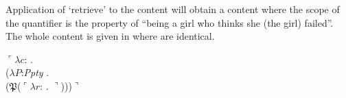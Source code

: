 Application of `$\mathrm{retrieve}$' to the content \preveg{} will obtain a content where
the scope of the quantifier is the property of ``being a girl who
thinks she (the girl) failed''.   The whole content is given in
\nexteg{} where  are identical.
\begin{ex} 
\begin{subex} 
 
\item $\ulcorner\lambda c$: . \\
  \hspace*{1em}($\lambda P$:\textit{Ppty} .  \\
  \hspace*{2em}($\mathfrak{P}$($\ulcorner\lambda r$: . $\urcorner$)))$\urcorner$
 

\end{subex}
\end{ex}
